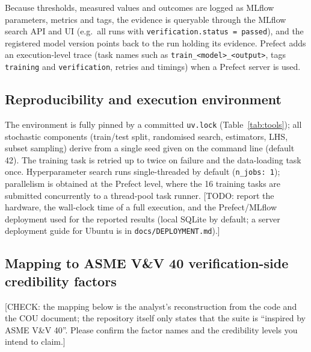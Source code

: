 Because thresholds, measured values and outcomes are logged as MLflow
parameters, metrics and tags, the evidence is queryable through the MLflow
search API and UI (e.g.\ all runs with \texttt{verification.status =
passed}), and the registered model version points back to the run holding
its evidence. Prefect adds an execution-level trace (task names such as
\texttt{train\_<model>\_<output>}, tags \texttt{training} and
\texttt{verification}, retries and timings) when a Prefect server is used.

\subsection{Reproducibility and execution environment}
\label{sec:methods:repro}

The environment is fully pinned by a committed \texttt{uv.lock}
(Table~\ref{tab:tools}); all stochastic components (train/test split,
randomised search, estimators, LHS, subset sampling) derive from a single
seed given on the command line (default 42). The training task is retried up
to twice on failure and the data-loading task once. Hyperparameter search
runs single-threaded by default (\texttt{n\_jobs: 1}); parallelism is
obtained at the Prefect level, where the 16 training tasks are submitted
concurrently to a thread-pool task runner. [TODO: report the hardware, the
wall-clock time of a full execution, and the Prefect/MLflow deployment used
for the reported results (local SQLite by default; a server deployment guide
for Ubuntu is in \texttt{docs/DEPLOYMENT.md}).]

\subsection{Mapping to ASME V\&V 40 verification-side credibility factors}
\label{sec:methods:vv40}

[CHECK: the mapping below is the analyst's reconstruction from the code and
the COU document; the repository itself only states that the suite is
``inspired by ASME V\&V 40''. Please confirm the factor names and the
credibility levels you intend to claim.]


